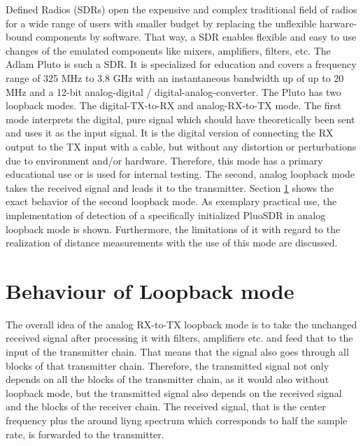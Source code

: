 \documentclass[journal]{IEEEtran}
\begin{document}
 Defined Radios (SDRs) open the expensive and complex traditional field of radios for a wide range of users with smaller budget by replacing the unflexible harware-bound components by software. That way, a SDR enables flexible and easy to use changes of the emulated components like mixers, amplifiers, filters, etc. The Adlam Pluto is such a SDR. It is specialized for education and covers a frequency range of 325 MHz to 3.8 GHz with an instantaneous bandwidth up of up to 20 MHz and a 12-bit analog-digital / digital-analog-converter. 
The Pluto has two loopback modes. The digital-TX-to-RX and analog-RX-to-TX mode. The first mode interprets the digital, pure signal which should have theoretically been sent and uses it as the input signal. It is the digital version of connecting the RX output to the TX input with a cable, but without any distortion or perturbations due to environment and/or hardware. Therefore, this mode has a primary educational use or is used for internal testing. 
The second, analog loopback mode takes the received signal and leads it to the transmitter. Section \ref{sec:behaviourLoopback} shows the exact behavior of the second loopback mode. 
As exemplary practical use, the implementation of detection of a specifically initialized PluoSDR in analog loopback mode is shown. Furthermore, the limitations of it with regard to the realization of distance measurements with the use of this mode are discussed.


\section{Behaviour of Loopback mode}
\label{sec:behaviourLoopback}
The overall idea of the analog RX-to-TX loopback mode is to take the unchanged received signal after processing it with filters, amplifiers etc. and feed that to the input of the transmitter chain.
That means that the signal also goes through all blocks of that transmitter chain.
Therefore, the transmitted signal not only depends on all the blocks of the transmitter chain, as it would also without loopback mode, but the transmitted signal also depends on the received signal and the blocks of the receiver chain.
The received signal, that is the center frequency plus the around liyng spectrum which corresponds to half the sample rate, is forwarded to the transmitter.
\end{document}
